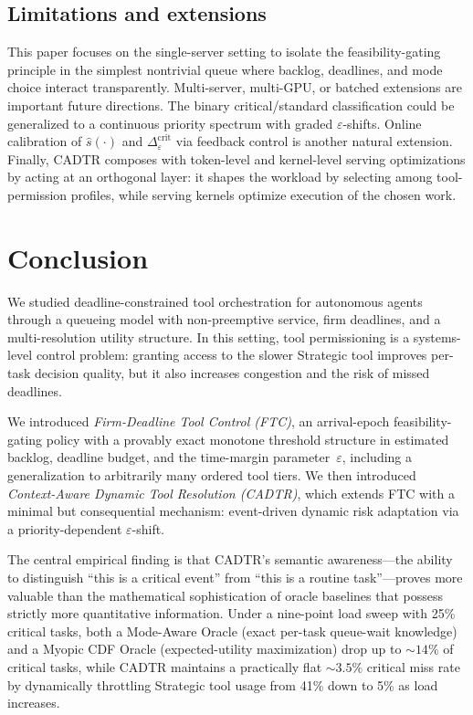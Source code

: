 \documentclass[fleqn,12pt,lineno]{wlpeerj}
\begin{document}
\subsection{Limitations and extensions}
This paper focuses on the single-server setting to isolate the feasibility-gating principle in the simplest nontrivial queue where backlog, deadlines, and mode choice interact transparently. Multi-server, multi-GPU, or batched extensions are important future directions. The binary critical/standard classification could be generalized to a continuous priority spectrum with graded $\varepsilon$-shifts. Online calibration of $\hat{s}(\cdot)$ and $\Delta_{\varepsilon}^{\mathrm{crit}}$ via feedback control is another natural extension. Finally, CADTR composes with token-level and kernel-level serving optimizations by acting at an orthogonal layer: it shapes the workload by selecting among tool-permission profiles, while serving kernels optimize execution of the chosen work.


\section{Conclusion}
\label{conclusion}
We studied deadline-constrained tool orchestration for autonomous agents through a queueing model with non-preemptive service, firm deadlines, and a multi-resolution utility structure. In this setting, tool permissioning is a systems-level control problem: granting access to the slower Strategic tool improves per-task decision quality, but it also increases congestion and the risk of missed deadlines.

We introduced \emph{Firm-Deadline Tool Control (FTC)}, an arrival-epoch feasibility-gating policy with a provably exact monotone threshold structure in estimated backlog, deadline budget, and the time-margin parameter~$\varepsilon$, including a generalization to arbitrarily many ordered tool tiers. We then introduced \emph{Context-Aware Dynamic Tool Resolution (CADTR)}, which extends FTC with a minimal but consequential mechanism: event-driven dynamic risk adaptation via a priority-dependent $\varepsilon$-shift.

The central empirical finding is that CADTR's semantic awareness---the ability to distinguish ``this is a critical event'' from ``this is a routine task''---proves more valuable than the mathematical sophistication of oracle baselines that possess strictly more quantitative information. Under a nine-point load sweep with 25\% critical tasks, both a Mode-Aware Oracle (exact per-task queue-wait knowledge) and a Myopic CDF Oracle (expected-utility maximization) drop up to ${\sim}14\%$ of critical tasks, while CADTR maintains a practically flat ${\sim}3.5\%$ critical miss rate by dynamically throttling Strategic tool usage from 41\% down to 5\% as load increases.
\end{document}
